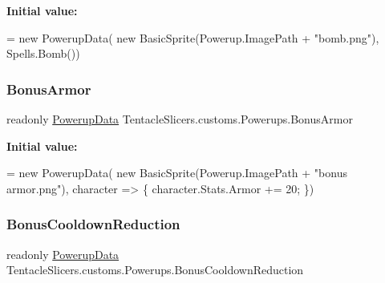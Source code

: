 {\bfseries Initial value\+:}
\begin{DoxyCode}
= \textcolor{keyword}{new} PowerupData(
            \textcolor{keyword}{new} BasicSprite(Powerup.ImagePath + \textcolor{stringliteral}{"bomb.png"}), Spells.Bomb())
\end{DoxyCode}
\mbox{\label{class_tentacle_slicers_1_1customs_1_1_powerups_afaf8bca356a82ba6acc60b119de3276f}} 
\subsubsection{\texorpdfstring{Bonus\+Armor}{BonusArmor}}
{\footnotesize\ttfamily readonly \hyperlink{class_tentacle_slicers_1_1actors_1_1_powerup_data}{Powerup\+Data} Tentacle\+Slicers.\+customs.\+Powerups.\+Bonus\+Armor\hspace{0.3cm}{\ttfamily [static]}}

{\bfseries Initial value\+:}
\begin{DoxyCode}
= \textcolor{keyword}{new} PowerupData(
            \textcolor{keyword}{new} BasicSprite(Powerup.ImagePath + \textcolor{stringliteral}{"bonus armor.png"}), character =>
            \{
                character.Stats.Armor += 20;
            \})
\end{DoxyCode}
\mbox{\label{class_tentacle_slicers_1_1customs_1_1_powerups_a42a5c2564d669b12f9096702e755a912}} 
\subsubsection{\texorpdfstring{Bonus\+Cooldown\+Reduction}{BonusCooldownReduction}}
{\footnotesize\ttfamily readonly \hyperlink{class_tentacle_slicers_1_1actors_1_1_powerup_data}{Powerup\+Data} Tentacle\+Slicers.\+customs.\+Powerups.\+Bonus\+Cooldown\+Reduction\hspace{0.3cm}{\ttfamily [static]}}

